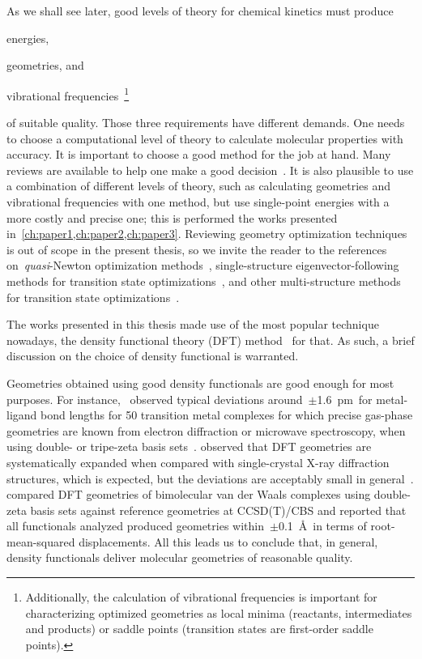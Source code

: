 As we shall see later,
good levels of theory for chemical kinetics
must produce
\begin{enumerate*}
	\item energies,
	\item geometries,
	      and
	\item vibrational frequencies~\footnote{Additionally,
		      the calculation of vibrational frequencies
		      is important for characterizing optimized geometries
		      as local minima (reactants,
		      intermediates and products)
		      or saddle points (transition states are first-order saddle points).}
\end{enumerate*}
of suitable quality.
Those three requirements have different demands.
One needs to choose a computational level of theory to calculate
molecular properties with accuracy.
It is important to choose a good method for the job at hand.
Many reviews are available to help one make a good decision~\cite{Goerigk_2011,Goerigk_2019,Mardirossian_2017,Morgante_2020,Bursch_2022}.
It is also plausible to use a combination of different levels of theory,
such as calculating geometries and vibrational frequencies with one method,
but use single-point energies with a more costly and precise one;
this is performed the works presented in~\cref{ch:paper1,ch:paper2,ch:paper3}.
Reviewing geometry optimization techniques is out of scope in the present
thesis,
so we invite the reader to the references
on~\emph{quasi}-Newton optimization methods~\cite{Banerjee_1985,Schlegel_1987},
single-structure eigenvector-following methods for transition state optimizations~\cite{Banerjee_1985,Schlegel_1987,Mauro_2005},
and other multi-structure methods
for transition state optimizations~\cite{Peng_1993,Peng_1996,Henkelman_2000a,Henkelman_2000b,Henkelman_2002,Sheppard_2008,Zimmerman_2013a,Zimmerman_2013b,Zimmerman_2015,Jafari_2017}.

The works presented in this thesis made use of the most popular technique nowadays,
the density functional theory (DFT)
method~\cite{Hohenberg_1964,Kohn_1965,Perdew_2014,Kryachko_2014,Yu_2016} for
that.
As such,
a brief discussion on the choice of density functional is warranted.

Geometries obtained using good density functionals are good enough
for most purposes.
For instance,~\citeauthor{Bühl_2006} observed typical deviations around~$\pm$1.6~pm~for
metal-ligand bond lengths for 50 transition metal complexes for which precise gas-phase geometries
are known from electron diffraction or microwave spectroscopy,
when using double- or tripe-zeta basis sets~\cite{Bühl_2006}.
\citeauthor{Minenkov_2012} observed that
DFT geometries are systematically expanded when compared with single-crystal
X-ray diffraction structures,
which is expected,
but the deviations are
acceptably small in general~\cite{Minenkov_2012}.
\citeauthor{Sirianni_2018} compared DFT geometries of bimolecular van der Waals complexes using
double-zeta basis sets against reference geometries at CCSD(T)/CBS
and reported that all functionals analyzed produced
geometries within~$\pm$0.1~\AA{}~in terms
of root-mean-squared displacements.
All this leads us to conclude that,
in general,
density functionals deliver molecular geometries of reasonable quality.

